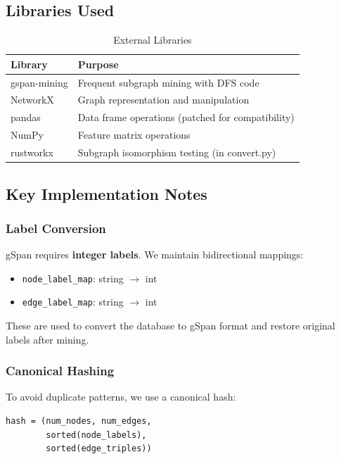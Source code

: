 \documentclass[12pt,a4paper]{article}
\begin{document}
\subsection{Libraries Used}

\begin{table}[H]
\centering
\begin{tabular}{ll}
\toprule
\textbf{Library} & \textbf{Purpose} \\
\midrule
gspan-mining & Frequent subgraph mining with DFS code \\
NetworkX & Graph representation and manipulation \\
pandas & Data frame operations (patched for compatibility) \\
NumPy & Feature matrix operations \\
rustworkx & Subgraph isomorphism testing (in convert.py) \\
\bottomrule
\end{tabular}
\caption{External Libraries}
\end{table}

\subsection{Key Implementation Notes}

\subsubsection{Label Conversion}

gSpan requires \textbf{integer labels}. We maintain bidirectional mappings:
\begin{itemize}
    \item \texttt{node\_label\_map}: string $\rightarrow$ int
    \item \texttt{edge\_label\_map}: string $\rightarrow$ int
\end{itemize}

These are used to convert the database to gSpan format and restore original labels after mining.

\subsubsection{Canonical Hashing}

To avoid duplicate patterns, we use a canonical hash:

\begin{verbatim}
hash = (num_nodes, num_edges, 
        sorted(node_labels), 
        sorted(edge_triples))
\end{verbatim}
\end{document}
